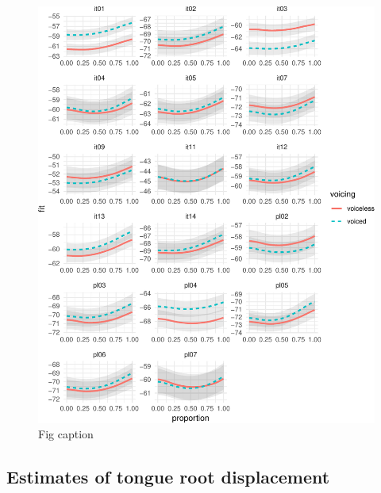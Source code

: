 \documentclass[12pt,]{article}
\begin{document}
\begin{figure}
\includegraphics[width=\linewidth]{2018-tra_files/figure-latex/tra-gam-s-ar-plot-1} \caption{Fig caption}\label{f:tra-gam-s-ar-plot}
\end{figure}

\subsection{Estimates of tongue root
displacement}\label{estimates-of-tongue-root-displacement}
\end{document}

